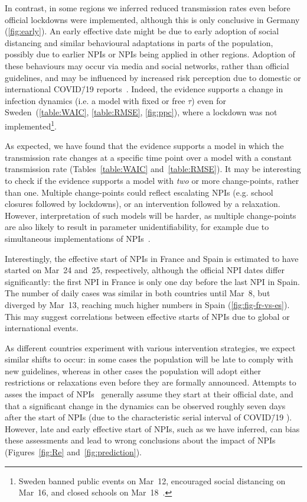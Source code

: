 \documentclass[12pt]{extarticle}
\newcommand{\covid}{COVID\=/19 }
\begin{document}
In contrast, in some regions we inferred reduced transmission rates even before official lockdowns were implemented, although this is only conclusive in Germany (\autoref{fig:early}).
An early effective date might be due to early adoption of social distancing and similar behavioural adaptations in parts of the population, possibly due to earlier NPIs or NPIs being applied in other regions.
Adoption of these behaviours may occur via media and social networks, rather than official guidelines, and may be influenced by increased risk perception due to domestic or international \covid reports~\citep{Arthur2020}.
Indeed, the evidence supports a change in infection dynamics (i.e. a model with fixed or free $\tau$) even for Sweden~(\autoref{table:WAIC}, \autoref{table:RMSE}, \autoref{fig:ppc}), where a lockdown was not implemented\footnote{Sweden banned public events on Mar~12, encouraged social distancing on Mar~16, and closed schools on Mar~18~\citep{Flaxman2020}.}.

As expected, we have found that the evidence supports a model in which the transmission rate changes at a specific time point over a model with a constant transmission rate (Tables~\ref{table:WAIC} and~\ref{table:RMSE}).
It may be interesting to check if the evidence supports a model with \emph{two} or more change-points, rather than one. 
Multiple change-points could reflect escalating NPIs (e.g. school closures followed by lockdowns), or an intervention followed by a relaxation.
However, interpretation of such models will be harder, as multiple change-points are also likely to result in parameter unidentifiability, for example due to simultaneous implementations of NPIs~\citep{Flaxman2020}.

Interestingly, the effective start of NPIs in France and Spain is estimated to have started on Mar~24 and~25, respectively,
although the official NPI dates differ significantly: the first NPI in France is only one day before the last NPI in Spain.
The number of daily cases was similar in both countries until Mar~8, but diverged by Mar~13, reaching much higher numbers in Spain (\autoref{fig:fig-fr-vs-es}).
This may suggest correlations between effective starts of NPIs due to global or international events.

As different countries experiment with various intervention strategies, we expect similar shifts to occur: in some cases the population will be late to comply with new guidelines, whereas in other cases the population will adopt either restrictions or relaxations even before they are formally announced.
Attempts to asses the impact of NPIs~\citep{Banholzer2020,Flaxman2020} generally assume they start at their official date, and that a significant change in the dynamics can be observed roughly seven days after the start of NPIs (due to the characteristic serial interval of \covid\citep{Ali2020}).
However, late and early effective start of NPIs, such as we have inferred, can bias these assessments and lead to wrong conclusions about the impact of NPIs (Figures~\ref{fig:Re} and~\ref{fig:prediction}).
\end{document}
